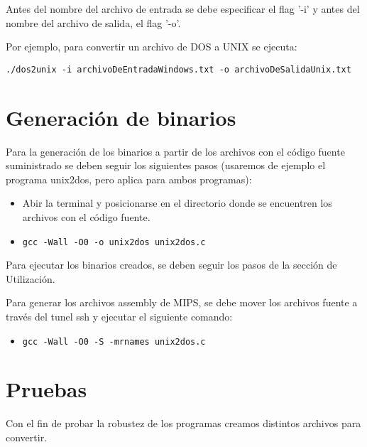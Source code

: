 \documentclass[a4paper,11pt]{article}
\begin{document}
\indent	
Antes del nombre del archivo de entrada se debe especificar el flag '-i' y antes del nombre del archivo de salida, el flag '-o'.

\indent	
Por ejemplo, para convertir un archivo de DOS a UNIX se ejecuta: 

\begin{verbatim}
./dos2unix -i archivoDeEntradaWindows.txt -o archivoDeSalidaUnix.txt
\end{verbatim}

\section{Generaci\'on de binarios}
Para la generaci\'on de los binarios a partir de los archivos con el c\'odigo fuente suministrado se deben seguir los siguientes pasos (usaremos de ejemplo el programa unix2dos, pero aplica para ambos programas):

\begin{itemize}
\item Abir la terminal y posicionarse en el directorio donde se encuentren los archivos con el c\'odigo fuente.
\item \begin{verbatim}
gcc -Wall -O0 -o unix2dos unix2dos.c
\end{verbatim} 
\end{itemize}

Para ejecutar los binarios creados, se deben seguir los pasos de la secci\'on de Utilizaci\'on.

Para generar los archivos assembly de MIPS, se debe mover los archivos fuente a trav\'es del tunel ssh y ejecutar el siguiente comando:
\begin{itemize}
\item \begin{verbatim}
gcc -Wall -O0 -S -mrnames unix2dos.c
\end{verbatim}
\end{itemize}

\section{Pruebas}
Con el fin de probar la robustez de los programas creamos distintos archivos para convertir.
\end{document}
